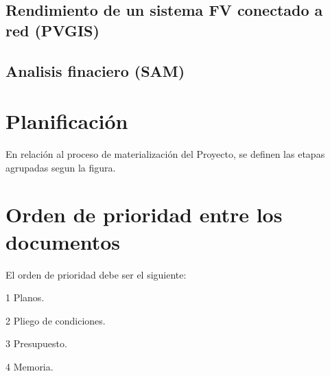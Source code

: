 \documentclass{article}
\begin{document}





\subsection{Rendimiento de un sistema FV conectado a red (PVGIS)}



\subsection{Analisis finaciero (SAM)}

\section{ Planificación}

En relación al proceso de materialización del Proyecto, se definen las etapas agrupadas segun la figura.




\section{ Orden de prioridad entre los documentos}

El orden de prioridad debe ser el siguiente:

1 Planos.

2 Pliego de condiciones.

3 Presupuesto.

4 Memoria.
\end{document}
